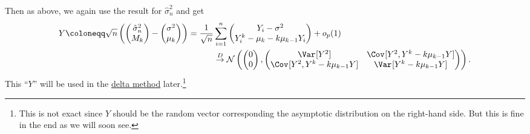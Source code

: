 Then as above, we again use the result for \(\hat{\sigma} _n^2\) and get
\[
	\begin{split}
		Y \coloneqq \sqrt{n} \left( \begin{pmatrix}
				                            \hat{\sigma} _n^2 \\
				                            M_k               \\
			                            \end{pmatrix} - \begin{pmatrix}
				                                            \sigma ^2 \\
				                                            \mu _k    \\
			                                            \end{pmatrix} \right)
		= \frac{1}{\sqrt{n} } & \sum_{i=1}^{n}  \begin{pmatrix}
			                                        Y_i - \sigma ^2                   \\
			                                        Y_i^k - \mu _k - k \mu _{k-1} Y_i \\
		                                        \end{pmatrix} + o_p(1)                                                                                                     \\
		                      & \overset{D}{\to} \mathcal{N} \left( \begin{pmatrix}
				                                                            0 \\
				                                                            0 \\
			                                                            \end{pmatrix} , \begin{pmatrix}
				                                                                            \Var_{}[Y^2]                        & \Cov_{}[Y^2 , Y^k - k \mu _{k-1} Y] \\
				                                                                            \Cov_{}[Y^2 , Y^k - k \mu _{k-1} Y] & \Var_{}[Y^k - k \mu _{k-1} Y]       \\
			                                                                            \end{pmatrix} \right).
	\end{split}
\]
This ``\(Y\)'' will be used in the \hyperref[thm:delta-method]{delta method} later.\footnote{This is not exact since \(Y\) should be the random vector corresponding the asymptotic distribution on the right-hand side. But this is fine in the end as we will soon see.}

